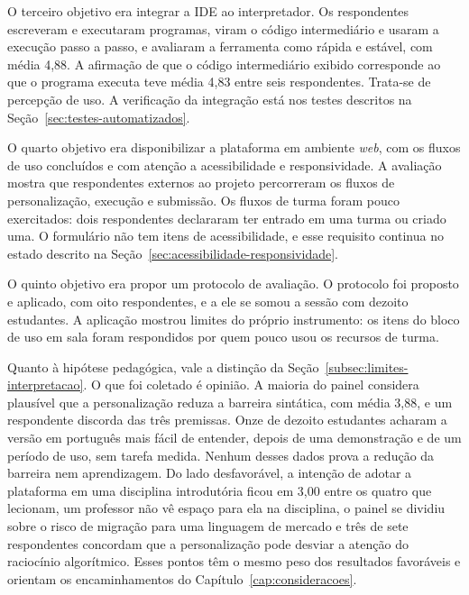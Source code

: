 O terceiro objetivo era integrar a IDE ao interpretador. Os respondentes escreveram e executaram programas, viram o código intermediário e usaram a execução passo a passo, e avaliaram a ferramenta como rápida e estável, com média 4,88. A afirmação de que o código intermediário exibido corresponde ao que o programa executa teve média 4,83 entre seis respondentes. Trata-se de percepção de uso. A verificação da integração está nos testes descritos na Seção~\ref{sec:testes-automatizados}.

O quarto objetivo era disponibilizar a plataforma em ambiente \textit{web}, com os fluxos de uso concluídos e com atenção a acessibilidade e responsividade. A avaliação mostra que respondentes externos ao projeto percorreram os fluxos de personalização, execução e submissão. Os fluxos de turma foram pouco exercitados: dois respondentes declararam ter entrado em uma turma ou criado uma. O formulário não tem itens de acessibilidade, e esse requisito continua no estado descrito na Seção~\ref{sec:acessibilidade-responsividade}.

O quinto objetivo era propor um protocolo de avaliação. O protocolo foi proposto e aplicado, com oito respondentes, e a ele se somou a sessão com dezoito estudantes. A aplicação mostrou limites do próprio instrumento: os itens do bloco de uso em sala foram respondidos por quem pouco usou os recursos de turma.

Quanto à hipótese pedagógica, vale a distinção da Seção~\ref{subsec:limites-interpretacao}. O que foi coletado é opinião. A maioria do painel considera plausível que a personalização reduza a barreira sintática, com média 3,88, e um respondente discorda das três premissas. Onze de dezoito estudantes acharam a versão em português mais fácil de entender, depois de uma demonstração e de um período de uso, sem tarefa medida. Nenhum desses dados prova a redução da barreira nem aprendizagem. Do lado desfavorável, a intenção de adotar a plataforma em uma disciplina introdutória ficou em 3,00 entre os quatro que lecionam, um professor não vê espaço para ela na disciplina, o painel se dividiu sobre o risco de migração para uma linguagem de mercado e três de sete respondentes concordam que a personalização pode desviar a atenção do raciocínio algorítmico. Esses pontos têm o mesmo peso dos resultados favoráveis e orientam os encaminhamentos do Capítulo~\ref{cap:consideracoes}.
